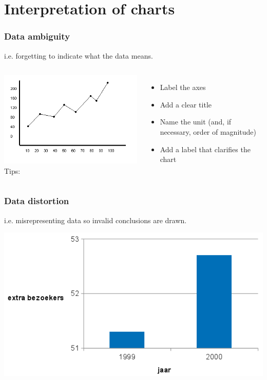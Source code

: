 \documentclass{beamer}
\begin{document}
\section{Interpretation of charts}

\begin{frame}
  \frametitle{Data ambiguity}

  i.e. forgetting to indicate what the data means.
  \vspace{1cm}

  \begin{columns}
    \includegraphics[width=\textwidth]{img/les2-02}
    Tips:
    \begin{itemize}
      \item Label the axes
      \item Add a clear title
      \item Name the unit (and, if necessary, order of magnitude)
      \item Add a label that clarifies the chart
    \end{itemize}
  \end{columns}
\end{frame}

\begin{frame}
  \frametitle{Data distortion}

  i.e. misrepresenting data so invalid conclusions are drawn.

  \begin{center}
    \includegraphics[width=.7\textwidth]{img/les2-03}
  \end{center}
\end{frame}
\end{document}
